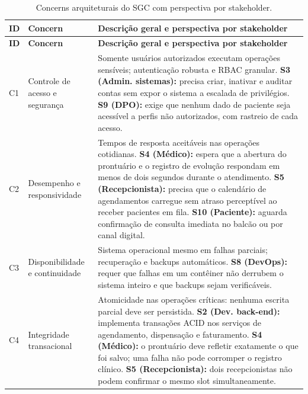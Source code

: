\begin{longtable}{|l|l|p{9.5cm}|}
\caption{Concerns arquiteturais do SGC com perspectiva por stakeholder.}
\label{tab:concerns-arquitetura} \\
\hline
\textbf{ID} & \textbf{Concern} & \textbf{Descrição geral e perspectiva por stakeholder} \\
\hline
\endfirsthead
\hline
\textbf{ID} & \textbf{Concern} & \textbf{Descrição geral e perspectiva por stakeholder} \\
\hline
\endhead
\hline
\endfoot
 
C1 & Controle de acesso e segurança &
Somente usuários autorizados executam operações sensíveis; autenticação robusta e RBAC granular.
\newline\textbf{S3 (Admin. sistemas):} precisa criar, inativar e auditar contas sem expor o sistema a escalada de privilégios.
\newline\textbf{S9 (DPO):} exige que nenhum dado de paciente seja acessível a perfis não autorizados, com rastreio de cada acesso. \\
\hline
C2 & Desempenho e responsividade &
Tempos de resposta aceitáveis nas operações cotidianas.
\newline\textbf{S4 (Médico):} espera que a abertura do prontuário e o registro de evolução respondam em menos de dois segundos durante o atendimento.
\newline\textbf{S5 (Recepcionista):} precisa que o calendário de agendamentos carregue sem atraso perceptível ao receber pacientes em fila.
\newline\textbf{S10 (Paciente):} aguarda confirmação de consulta imediata no balcão ou por canal digital. \\
\hline
C3 & Disponibilidade e continuidade &
Sistema operacional mesmo em falhas parciais; recuperação e backups automáticos.
\newline\textbf{S8 (DevOps):} requer que falhas em um contêiner não derrubem o sistema inteiro e que backups sejam verificáveis. \\
\hline
C4 & Integridade transacional &
Atomicidade nas operações críticas: nenhuma escrita parcial deve ser persistida.
\newline\textbf{S2 (Dev. back-end):} implementa transações ACID nos serviços de agendamento, dispensação e faturamento.
\newline\textbf{S4 (Médico):} o prontuário deve refletir exatamente o que foi salvo; uma falha não pode corromper o registro clínico.
\newline\textbf{S5 (Recepcionista):} dois recepcionistas não podem confirmar o mesmo slot simultaneamente.

\end{longtable}
